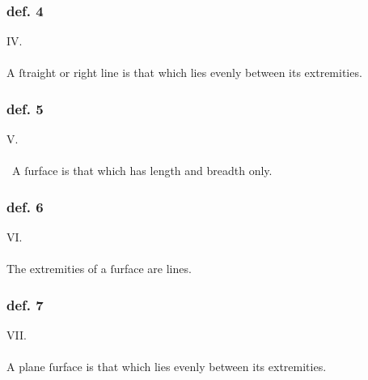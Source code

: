 \begin{minipage}{0.67\textwidth}
    \subsubsection{def. 4}
    \begin{center}
        IV.\label{book1def4}\\
        \hfill\\
        A ſtraight or right line is that which lies evenly between its \mbox{extremities}.
    \end{center}
    \subsubsection{def. 5}
    \begin{center}
        V.\label{book1def5}\\
        \hfill\\\
        A ſurface is that which has length and breadth only.\\
    \end{center}
    \subsubsection{def. 6}
    \begin{center}
        VI.\label{book1def6}\\
        \hfill\\
        The extremities of a ſurface are lines.\\
    \end{center}
    \subsubsection{def. 7}
    \begin{center}
        VII.\label{book1def7}\\
        \hfill\\
        A plane ſurface is that which lies evenly between its extremities.\\
    \end{center}
\end{minipage}

\pagebreak


